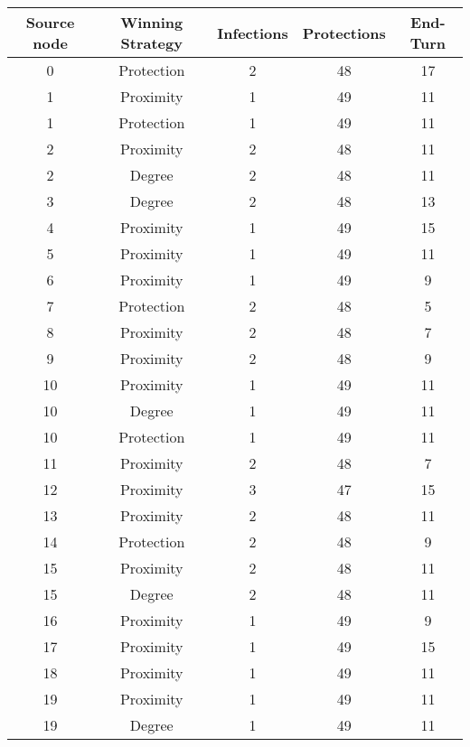 \documentclass[results.tex]{subfiles}
\begin{document}
\begin{center}
  \begin{tabular}{| c || c | c | c | c |}
    \hline
    {\bfseries Source node} & {\bfseries Winning Strategy} & {\bfseries Infections} & {\bfseries Protections} & {\bfseries End-Turn} \\  %
    \hline\hline
    0 & Protection & 2 & 48 & 17 \\ 
    \hline
    1 & Proximity & 1 & 49 & 11 \\ 
    \hline
    1 & Protection & 1 & 49 & 11 \\ 
    \hline
    2 & Proximity & 2 & 48 & 11 \\ 
    \hline
    2 & Degree & 2 & 48 & 11 \\ 
    \hline
    3 & Degree & 2 & 48 & 13 \\ 
    \hline
    4 & Proximity & 1 & 49 & 15 \\ 
    \hline
    5 & Proximity & 1 & 49 & 11 \\ 
    \hline
    6 & Proximity & 1 & 49 & 9 \\ 
    \hline
    7 & Protection & 2 & 48 & 5 \\ 
    \hline
    8 & Proximity & 2 & 48 & 7 \\ 
    \hline
    9 & Proximity & 2 & 48 & 9 \\ 
    \hline
    10 & Proximity & 1 & 49 & 11 \\ 
    \hline
    10 & Degree & 1 & 49 & 11 \\ 
    \hline
    10 & Protection & 1 & 49 & 11 \\ 
    \hline
    11 & Proximity & 2 & 48 & 7 \\ 
    \hline
    12 & Proximity & 3 & 47 & 15 \\ 
    \hline
    13 & Proximity & 2 & 48 & 11 \\ 
    \hline
    14 & Protection & 2 & 48 & 9 \\ 
    \hline
    15 & Proximity & 2 & 48 & 11 \\ 
    \hline
    15 & Degree & 2 & 48 & 11 \\ 
    \hline
    16 & Proximity & 1 & 49 & 9 \\ 
    \hline
    17 & Proximity & 1 & 49 & 15 \\ 
    \hline
    18 & Proximity & 1 & 49 & 11 \\ 
    \hline
    19 & Proximity & 1 & 49 & 11 \\ 
    \hline
    19 & Degree & 1 & 49 & 11 \\ 
    \hline

\end{tabular}
\end{center}
\end{document}

